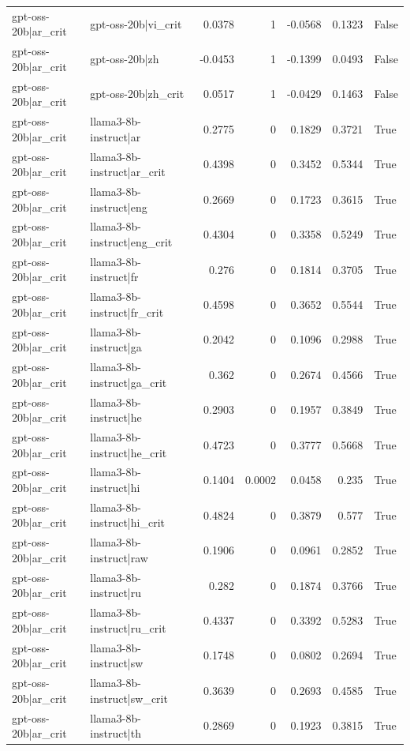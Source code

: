 \begin{table}
\begin{tabular}{l l r r r r l}
gpt-oss-20b|ar_crit & gpt-oss-20b|vi_crit & 0.0378 & 1 & -0.0568 & 0.1323 & False \\
gpt-oss-20b|ar_crit & gpt-oss-20b|zh & -0.0453 & 1 & -0.1399 & 0.0493 & False \\
gpt-oss-20b|ar_crit & gpt-oss-20b|zh_crit & 0.0517 & 1 & -0.0429 & 0.1463 & False \\
gpt-oss-20b|ar_crit & llama3-8b-instruct|ar & 0.2775 & 0 & 0.1829 & 0.3721 & True \\
gpt-oss-20b|ar_crit & llama3-8b-instruct|ar_crit & 0.4398 & 0 & 0.3452 & 0.5344 & True \\
gpt-oss-20b|ar_crit & llama3-8b-instruct|eng & 0.2669 & 0 & 0.1723 & 0.3615 & True \\
gpt-oss-20b|ar_crit & llama3-8b-instruct|eng_crit & 0.4304 & 0 & 0.3358 & 0.5249 & True \\
gpt-oss-20b|ar_crit & llama3-8b-instruct|fr & 0.276 & 0 & 0.1814 & 0.3705 & True \\
gpt-oss-20b|ar_crit & llama3-8b-instruct|fr_crit & 0.4598 & 0 & 0.3652 & 0.5544 & True \\
gpt-oss-20b|ar_crit & llama3-8b-instruct|ga & 0.2042 & 0 & 0.1096 & 0.2988 & True \\
gpt-oss-20b|ar_crit & llama3-8b-instruct|ga_crit & 0.362 & 0 & 0.2674 & 0.4566 & True \\
gpt-oss-20b|ar_crit & llama3-8b-instruct|he & 0.2903 & 0 & 0.1957 & 0.3849 & True \\
gpt-oss-20b|ar_crit & llama3-8b-instruct|he_crit & 0.4723 & 0 & 0.3777 & 0.5668 & True \\
gpt-oss-20b|ar_crit & llama3-8b-instruct|hi & 0.1404 & 0.0002 & 0.0458 & 0.235 & True \\
gpt-oss-20b|ar_crit & llama3-8b-instruct|hi_crit & 0.4824 & 0 & 0.3879 & 0.577 & True \\
gpt-oss-20b|ar_crit & llama3-8b-instruct|raw & 0.1906 & 0 & 0.0961 & 0.2852 & True \\
gpt-oss-20b|ar_crit & llama3-8b-instruct|ru & 0.282 & 0 & 0.1874 & 0.3766 & True \\
gpt-oss-20b|ar_crit & llama3-8b-instruct|ru_crit & 0.4337 & 0 & 0.3392 & 0.5283 & True \\
gpt-oss-20b|ar_crit & llama3-8b-instruct|sw & 0.1748 & 0 & 0.0802 & 0.2694 & True \\
gpt-oss-20b|ar_crit & llama3-8b-instruct|sw_crit & 0.3639 & 0 & 0.2693 & 0.4585 & True \\
gpt-oss-20b|ar_crit & llama3-8b-instruct|th & 0.2869 & 0 & 0.1923 & 0.3815 & True \\

\end{tabular}
\end{table}
